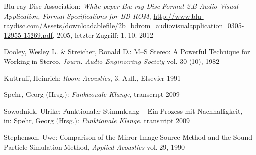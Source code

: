 \begin{thebibliography}{}

Blu-ray Disc Association: 
\emph{White paper Blu-ray Disc Format 2.B Audio Visual Application, Format Specifications for BD-ROM}, 
\url{http://www.blu-raydisc.com/Assets/downloadablefile/2b_bdrom_audiovisualapplication_0305-12955-15269.pdf}, 2005, letzter Zugriff: 1. 10. 2012

\bibitem[Production Partner

\bibitem[Dooley \& Streicher(1982)]{dooley_streicher} 
Dooley, Wesley L.  \& Streicher, Ronald D.:
\glqq M--S Stereo: A Powerful Technique for Working in Stereo\grqq, 
\emph{Journ. Audio Engineering Society} vol. 30 (10), 1982

Kuttruff, Heinrich: 
\emph{Room Acoustics}, 3. Aufl., Elsevier 1991

Spehr, Georg (Hrsg.): 
\emph{Funktionale Klänge}, transcript 2009

Sowodniok, Ulrike: 
\glqq Funktionaler Stimmklang -- Ein Prozess mit Nachhalligkeit\grqq, 
in: Spehr, Georg (Hrsg.): \emph{Funktionale Klänge}, transcript 2009

Stephenson, Uwe: 
\glqq Comparison of the Mirror Image Source Method and the Sound Particle Simulation Method\grqq, 
\emph{Applied Acoustics} vol. 29, 1990


\end{thebibliography}

\clearpage\thispagestyle{empty}
\eigen  %












